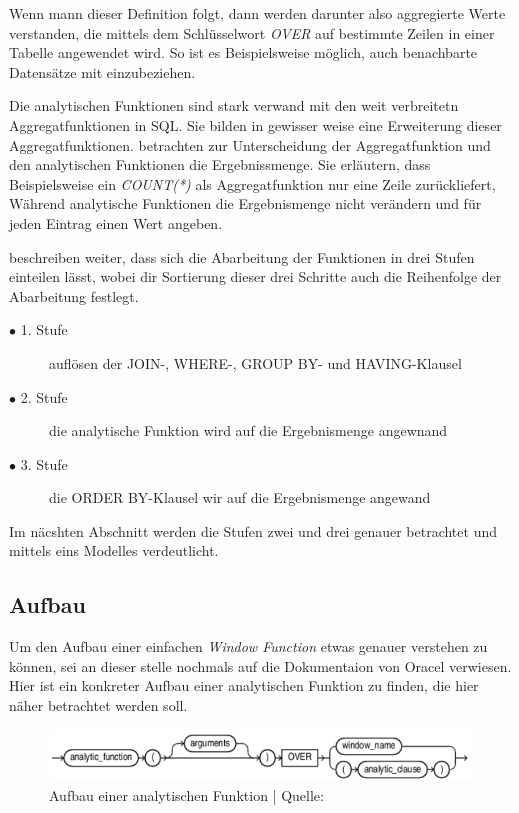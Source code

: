Wenn mann dieser Definition folgt, dann werden darunter also aggregierte Werte
verstanden, die mittels dem Schlüsselwort \textit{OVER} auf bestimmte Zeilen in
einer Tabelle angewendet wird. So ist es Beispielsweise möglich, auch
benachbarte Datensätze mit einzubeziehen.

Die analytischen Funktionen sind stark verwand mit den weit verbreitetn
Aggregatfunktionen in SQL. Sie bilden in gewisser weise eine Erweiterung dieser Aggregatfunktionen.
\cite{Nuijten2023} betrachten zur Unterscheidung der Aggregatfunktion und den
analytischen Funktionen die Ergebnissmenge. Sie erläutern, dass Beispielsweise
ein \textit{COUNT(*)} als Aggregatfunktion nur eine Zeile zurückliefert, Während
analytische Funktionen die Ergebnismenge nicht verändern und für jeden Eintrag
einen Wert angeben.

\cite{Nuijten2023} beschreiben weiter, dass sich die Abarbeitung der Funktionen in
drei Stufen einteilen lässt, wobei dir Sortierung dieser drei Schritte auch die
Reihenfolge der Abarbeitung festlegt.

\begin{description}
	\item[$\bullet$ 1. Stufe] auflösen der JOIN-, WHERE-, GROUP BY- und HAVING-Klausel

	\item[$\bullet$ 2. Stufe] die analytische Funktion wird auf die Ergebnismenge angewnand

	\item[$\bullet$ 3. Stufe] die ORDER BY-Klausel wir auf die Ergebnismenge angewand
\end{description}

Im näcshten Abschnitt werden die Stufen zwei und drei genauer betrachtet und mittels
eins Modelles verdeutlicht.

\subsection{Aufbau}
Um den Aufbau einer einfachen \textit{Window Function} etwas genauer verstehen
zu können, sei an dieser stelle nochmals auf die Dokumentaion von Oracel verwiesen.
Hier ist ein konkreter Aufbau einer analytischen Funktion zu finden, die hier näher
betrachtet werden soll.


\begin{figure}[h]
	\centering
	\includegraphics[scale=0.5]{img/aufbauAnalyticFunction.jpg}
	\caption{ Aufbau einer analytischen Funktion | Quelle: \cite{oracle}}
\end{figure}


